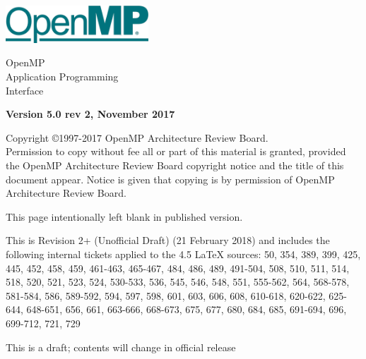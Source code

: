 
  \begin{titlepage}
    \begin{flushleft}
     \hspace{-6em} \includegraphics[width=0.4\textwidth]{openmp-logo.png}
    \end{flushleft}

    \begin{adjustwidth}{-0.75in}{0in}
    \begin{center}
      \Huge
      \textsf{OpenMP\\Application Programming\\Interface}

      \vspace{0.5in}\textsf{    }\vspace{-0.7in}
      \normalsize

      \vspace{1.0in}

      \textbf{Version 5.0 rev 2, November 2017}
    \end{center}
    \end{adjustwidth}

    \vspace{3.0in}

\begin{adjustwidth}{0pt}{1em}\setlength{\parskip}{0.25\baselineskip}%
Copyright \copyright 1997-2017 OpenMP Architecture Review Board.\\
Permission to copy without fee all or part of this material is granted,
provided the OpenMP Architecture Review Board copyright notice and
the title of this document appear. Notice is given that copying is by
permission of OpenMP Architecture Review Board.\end{adjustwidth}

  \end{titlepage}


\clearpage
\thispagestyle{empty}
\phantom{a}
This page intentionally left blank in published version.

This is Revision 2+ (Unofficial Draft) (21 February 2018) and
includes the following internal tickets applied to the 4.5 LaTeX sources:
50, 354, 389, 399, 425, 445, 452, 458, 459, 461-463, 465-467, 484, 486, 489, 
491-504, 508, 510, 511, 514, 518, 520, 521, 523, 524, 530-533, 536, 545, 
546, 548, 551, 555-562, 564, 568-578, 581-584, 586, 589-592, 594, 597, 598,
601, 603, 606, 608, 610-618, 620-622, 625-644, 648-651, 656, 661, 663-666, 
668-673, 675, 677, 680, 684, 685, 691-694, 696, 699-712, 721, 729

This is a draft; contents will change in official release

\vfill

